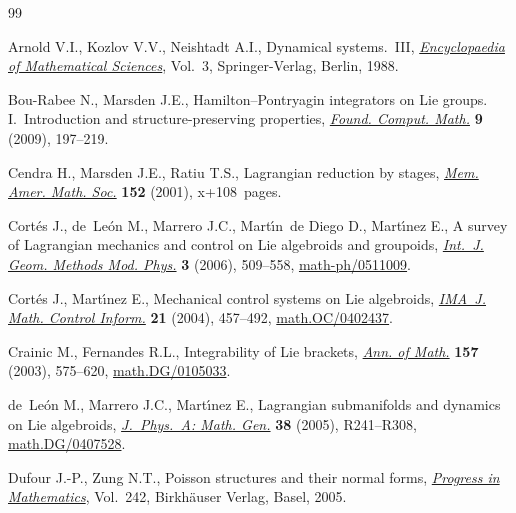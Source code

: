 \documentclass[pdftex]{sigma}
\numberwithin{equation}{section}
\begin{document}
\begin{thebibliography}{99}
\footnotesize\itemsep=0pt

Arnold V.I., Kozlov V.V., Neishtadt A.I., Dynamical systems.~{III},
 \href{https://doi.org/10.1007/978-3-662-02535-2}{\textit{Encyclopaedia of Mathematical Sciences}}, Vol.~3, Springer-Verlag,
 Berlin, 1988.

Bou-Rabee N., Marsden J.E., Hamilton--{P}ontryagin integrators on {L}ie groups.
 {I}.~{I}ntroduction and structure-preserving properties, \href{https://doi.org/10.1007/s10208-008-9030-4}{\textit{Found.
 Comput. Math.}} \textbf{9} (2009), 197--219.

Cendra H., Marsden J.E., Ratiu T.S., Lagrangian reduction by stages,
 \href{https://doi.org/10.1090/memo/0722}{\textit{Mem. Amer. Math. Soc.}} \textbf{152} (2001), x+108~pages.

Cort\'es J., de~Le\'on M., Marrero J.C., Mart\'{\i}n~de Diego D., Mart\'{\i}nez
 E., A survey of {L}agrangian mecha\-nics and control on {L}ie algebroids and
 groupoids, \href{https://doi.org/10.1142/S0219887806001211}{\textit{Int.~J. Geom. Methods Mod. Phys.}} \textbf{3} (2006),
 509--558, \mbox{\href{http://arxiv.org/abs/math-ph/0511009}{math-ph/0511009}}.

Cort\'es J., Mart\'{\i}nez E., Mechanical control systems on {L}ie algebroids,
 \href{https://doi.org/10.1093/imamci/21.4.457}{\textit{IMA~J. Math. Control Inform.}} \textbf{21} (2004), 457--492,
 \href{http://arxiv.org/abs/#2}{math.OC/0402437}.

Crainic M., Fernandes R.L., Integrability of {L}ie brackets, \href{https://doi.org/10.4007/annals.2003.157.575}{\textit{Ann. of
 Math.}} \textbf{157} (2003), 575--620, \href{http://arxiv.org/abs/math.DG/0105033}{math.DG/0105033}.

de~Le\'on M., Marrero J.C., Mart\'{\i}nez E., Lagrangian submanifolds and
 dynamics on {L}ie algebroids, \href{https://doi.org/10.1088/0305-4470/38/24/R01}{\textit{J.~Phys.~A: Math. Gen.}} \textbf{38}
 (2005), R241--R308, \href{http://arxiv.org/abs/math.DG/0407528}{math.DG/0407528}.

Dufour J.-P., Zung N.T., Poisson structures and their normal forms,
 \href{https://doi.org/10.1007/b137493}{\textit{Progress in Mathematics}}, Vol.~242, Birkh\"auser Verlag, Basel, 2005.


\end{thebibliography}
\end{document}
